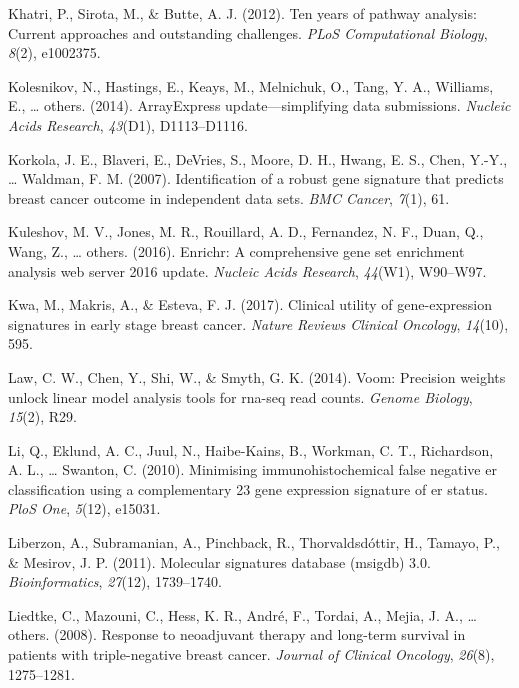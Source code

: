 \documentclass[12pt,twoside]{reedthesis}
\begin{document}
\leavevmode\hypertarget{ref-khatri2012ten}{}%
Khatri, P., Sirota, M., \& Butte, A. J. (2012). Ten years of pathway analysis: Current approaches and outstanding challenges. \emph{PLoS Computational Biology}, \emph{8}(2), e1002375.

\leavevmode\hypertarget{ref-kolesnikov2014arrayexpress}{}%
Kolesnikov, N., Hastings, E., Keays, M., Melnichuk, O., Tang, Y. A., Williams, E., \ldots{} others. (2014). ArrayExpress update---simplifying data submissions. \emph{Nucleic Acids Research}, \emph{43}(D1), D1113--D1116.

\leavevmode\hypertarget{ref-korkola2007identification}{}%
Korkola, J. E., Blaveri, E., DeVries, S., Moore, D. H., Hwang, E. S., Chen, Y.-Y., \ldots{} Waldman, F. M. (2007). Identification of a robust gene signature that predicts breast cancer outcome in independent data sets. \emph{BMC Cancer}, \emph{7}(1), 61.

\leavevmode\hypertarget{ref-kuleshov2016enrichr}{}%
Kuleshov, M. V., Jones, M. R., Rouillard, A. D., Fernandez, N. F., Duan, Q., Wang, Z., \ldots{} others. (2016). Enrichr: A comprehensive gene set enrichment analysis web server 2016 update. \emph{Nucleic Acids Research}, \emph{44}(W1), W90--W97.

\leavevmode\hypertarget{ref-kwa2017clinical}{}%
Kwa, M., Makris, A., \& Esteva, F. J. (2017). Clinical utility of gene-expression signatures in early stage breast cancer. \emph{Nature Reviews Clinical Oncology}, \emph{14}(10), 595.

\leavevmode\hypertarget{ref-law2014voom}{}%
Law, C. W., Chen, Y., Shi, W., \& Smyth, G. K. (2014). Voom: Precision weights unlock linear model analysis tools for rna-seq read counts. \emph{Genome Biology}, \emph{15}(2), R29.

\leavevmode\hypertarget{ref-li2010minimising}{}%
Li, Q., Eklund, A. C., Juul, N., Haibe-Kains, B., Workman, C. T., Richardson, A. L., \ldots{} Swanton, C. (2010). Minimising immunohistochemical false negative er classification using a complementary 23 gene expression signature of er status. \emph{PloS One}, \emph{5}(12), e15031.

\leavevmode\hypertarget{ref-liberzon2011molecular}{}%
Liberzon, A., Subramanian, A., Pinchback, R., Thorvaldsdóttir, H., Tamayo, P., \& Mesirov, J. P. (2011). Molecular signatures database (msigdb) 3.0. \emph{Bioinformatics}, \emph{27}(12), 1739--1740.

\leavevmode\hypertarget{ref-liedtke2008response}{}%
Liedtke, C., Mazouni, C., Hess, K. R., André, F., Tordai, A., Mejia, J. A., \ldots{} others. (2008). Response to neoadjuvant therapy and long-term survival in patients with triple-negative breast cancer. \emph{Journal of Clinical Oncology}, \emph{26}(8), 1275--1281.
\end{document}

